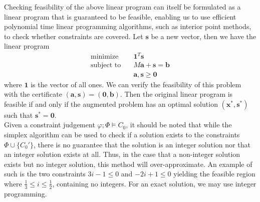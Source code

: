 Checking feasibility of the above linear program can itself be formulated as a linear program that is guaranteed to be feasible, enabling us to use efficient polynomial time linear programming algorithms, such as interior point methods, to check whether constraints are covered. Let $\mathbf{s}$ be a new vector, then we have the linear program
%
\begin{align*}
    \text{minimize}&\quad \mathbf{1}^T\mathbf{s}\\
    \text{subject to}&\quad M\mathbf{a} + \mathbf{s} = \mathbf{b}\\
    &\quad\mathbf{a},\mathbf{s} \geq \mathbf{0}
\end{align*}
where $\mathbf{1}$ is the vector of all ones. We can verify the feasibility of this problem with the certificate $(\mathbf{a},\mathbf{s})=(\mathbf{0},\mathbf{b})$. Then the original linear program is feasible if and only if the augmented problem has an optimal solution $(\mathbf{x}^*,\mathbf{s}^*)$ such that $\mathbf{s}^* = \mathbf{0}$.\\

Given a constraint judgement $\varphi;\Phi \vDash C_0$, it should be noted that while the simplex algorithm can be used to check if a solution exists to the constraints $\Phi \cup \{C_0'\}$, there is no guarantee that the solution is an integer solution nor that an integer solution exists at all. Thus, in the case that a non-integer solution exists but no integer solution, this method will over-approximate. An example of such is the two constraints $3i - 1 \leq 0$ and $-2i + 1 \leq 0$ yielding the feasible region where $\frac{1}{3} \leq i \leq \frac{1}{2}$, containing no integers. For an exact solution, we may use integer programming.

